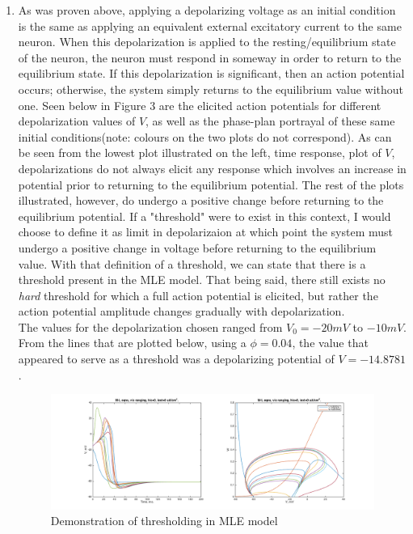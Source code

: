 \documentclass[10pt]{report}
\begin{document}
\begin{enumerate}
\item As was proven above, applying a depolarizing voltage as an initial condition is the same as applying an equivalent external excitatory current to the same neuron. When this depolarization is applied to the resting/equilibrium state of the neuron, the neuron must respond in someway in order to return to the equilibrium state. If this depolarization is significant, then an action potential occurs; otherwise, the system simply returns to the equilibrium value without one. Seen below in Figure 3 are the elicited action potentials for different depolarization values of $V$, as well as the phase-plan portrayal of these same initial conditions(note: colours on the two plots do not correspond). As can be seen from the lowest plot illustrated on the left, time response, plot of $V$, depolarizations do not always elicit any response which involves an increase in potential prior to returning to the equilibrium potential. The rest of the plots illustrated, however, do undergo a positive change before returning to the equilibrium potential. If a "threshold" were to exist in this context, I would choose to define it as limit in depolarizaion at which point the system must undergo a positive change in voltage before returning to the equilibrium value. With that definition of a threshold, we can state that there is a threshold present in the MLE model. That being said, there still exists no \emph{hard} threshold for which a full action potential is elicited, but rather the action potential amplitude changes gradually with depolarization.\\ The values for the depolarization chosen ranged from $V_0 = -20mV$ to $-10mV$. From the lines that are plotted below, using a $\phi =0.04$, the value that appeared to serve as a threshold was a depolarizing potential of $V = -14.8781$. \begin{figure}[h!] \includegraphics[scale=0.31]{motnq7.png}  \caption[h3]{Demonstration of thresholding in MLE model} \end{figure}
%
%

\end{enumerate}
\end{document}

